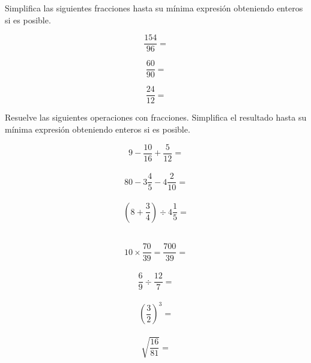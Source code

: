 \documentclass[11pt]{article}
\begin{document}
\vspace{1cm}

Simplifica las siguientes fracciones hasta su m\'inima expresi\'on obteniendo enteros si es posible.
\setcounter{equation}{0}


\begin{multicols}{3}

\begin{equation}    \frac{154}{96}    =     \end{equation}

\begin{equation}    \frac{60}{90}    =     \end{equation}

\begin{equation}    \frac{24}{12}    =     \end{equation}

\end{multicols}

\vspace{1cm}

Resuelve las siguientes operaciones con fracciones. Simplifica el resultado hasta su m\'inima expresi\'on obteniendo enteros si es posible.
\setcounter{equation}{0}


\begin{equation}    9 - \frac{10}{16} +\frac{5}{12} =   \end{equation} \\

\begin{equation}    80 - 3\frac{4}{5} -4\frac{2}{10} =  \end{equation} \\

\begin{equation}    \left( 8 +  \frac{3}{4} \right) \div 4\frac{1}{5}   =   \end{equation}\\

\begin{multicols}{2}

\begin{equation}    10 \times \frac{70}{39} = \frac{700}{39} =      \end{equation}\\

\begin{equation}    \frac{6}{9} \div \frac{12}{7} = \end{equation}\\

\begin{equation}    \left( \frac{3}{2} \right)^3= \end{equation} \\

\begin{equation}    \sqrt{\frac{16}{81}}= \end{equation} \\

\end{multicols}
\end{document}
